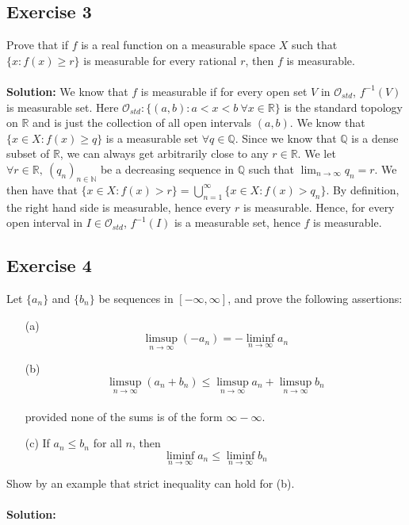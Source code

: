 \documentclass{article}
\begin{document}
\subsection*{Exercise 3}
Prove that if $f$ is a real function on a measurable space $X$ such that $\{ x:f(x) \ge r\}$ is measurable
for every rational $r$, then $f$ is measurable.
\\\\
\textbf{Solution:}
We know that $f$ is measurable if for every open set $V$ in $\mathcal{O}_{std}$, $f^{-1}(V)$ is measurable set.
Here $\mathcal{O}_{std}:\{ (a,b): a < x < b \ \forall x \in \mathbb{R} \}$ is the standard topology on $\mathbb{R}$ and is just the collection of all open intervals $(a,b)$.
We know that $\{x \in X: f(x) \ge q\}$ is a measurable set $ \forall q \in \mathbb{Q}$. Since we know that $\mathbb{Q}$ is a dense subset of $\mathbb{R}$, we can always get arbitrarily close to any $r \in \mathbb{R}$.
We let $\forall r \in \mathbb{R}, \ (q_n)_{n\in\mathbb{N}}$ be a decreasing sequence in $\mathbb{Q}$ such that $\lim_{n\to\infty} q_n = r$.
We then have that $\{x \in X: f(x) > r\} = \bigcup_{n=1}^{\infty} \{ x \in X: f(x) > q_n\}$.
By definition, the right hand side is measurable, hence every $r$ is measurable.
Hence, for every open interval in $ I \in \mathcal{O}_{std}$, $f^{-1}(I)$ is a measurable set, hence $f$ is measurable.


\subsection*{Exercise 4}
Let $\{a_n\}$ and $\{b_n\}$ be sequences in $[-\infty, \infty]$, and prove the following assertions:

\begin{enumerate}
    \item[(a)]  \[\limsup_{n\to\infty} (-a_n) = - \liminf_{n\to\infty} a_n \]
    \item[(b)]  \[\limsup_{n\to\infty} (a_n + b_n) \le \limsup_{n\to\infty} a_n + \limsup_{n\to\infty} b_n \]\\
    provided none of the sums is of the form $\infty - \infty$.
    \item[(c)] If $a_n \le b_n$ for all $n$, then 
        \[ \liminf_{n\to\infty} a_n \le \liminf_{n\to\infty} b_n\]
\end{enumerate}
Show by an example that strict inequality can hold for (b).
\\\\
\textbf{Solution:}
\end{document}

